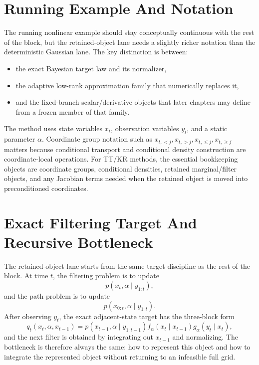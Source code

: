 \section{Running Example And Notation}
\label{sec:bf-hd-ttkr-notation}

The running nonlinear example should stay conceptually continuous with the rest
of the block, but the retained-object lane needs a slightly richer notation than
the deterministic Gaussian lane.  The key distinction is between:
\begin{itemize}[leftmargin=0.28in]
  \item the exact Bayesian target law and its normalizer,
  \item the adaptive low-rank approximation family that numerically replaces it,
  \item and the fixed-branch scalar/derivative objects that later chapters may
  define from a frozen member of that family.
\end{itemize}
The method uses state variables \(x_t\), observation variables \(y_t\), and a
static parameter \(\alpha\).  Coordinate group notation such as
\(x_{t,<j},x_{t,>j},x_{t,\le j},x_{t,\ge j}\) matters because conditional
transport and conditional density construction are coordinate-local operations.
For TT/KR methods, the essential bookkeeping objects are coordinate groups,
conditional densities, retained marginal/filter objects, and any Jacobian terms
needed when the retained object is moved into preconditioned coordinates.

\section{Exact Filtering Target And Recursive Bottleneck}
\label{sec:bf-hd-ttkr-exact-target}

The retained-object lane starts from the same target discipline as the rest of
the block.  At time \(t\), the filtering problem is to update
\[
  p(x_t,\alpha\mid y_{1:t}),
\]
and the path problem is to update
\[
  p(x_{0:t},\alpha\mid y_{1:t}).
\]
After observing \(y_t\), the exact adjacent-state target has the three-block
form
\[
  q_t(x_t,\alpha,x_{t-1})
  =
  p(x_{t-1},\alpha\mid y_{1:t-1})
  f_\alpha(x_t\mid x_{t-1})
  g_\alpha(y_t\mid x_t),
\]
and the next filter is obtained by integrating out \(x_{t-1}\) and normalizing.
The bottleneck is therefore always the same: how to represent this object and
how to integrate the represented object without returning to an infeasible full
grid.

